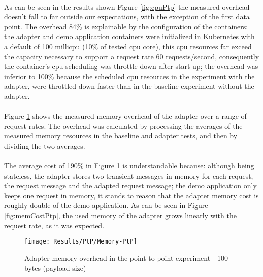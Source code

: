 \paragraph{}

As can be seen in the results shown Figure \ref{fig:cpuPtp} the measured overhead doesn't fall to far outside our expectations, with the exception of the first data point.
The overhead 84\% is explainable by the configuration of the containers:
the adapter and demo application containers were initialized in Kubernetes with a default of 100 millicpu (10\% of tested cpu core),
this cpu resources far exceed the capacity necessary to support a request rate 60 requests/second,
consequently the container's cpu scheduling was throttle-down after start up;
the overhead was inferior to 100\% because the scheduled cpu resources in the experiment with the adapter, were throttled down faster than in the baseline experiment without the adapter.

\paragraph{}

Figure \ref{fig:memPtp} shows the measured memory overhead of the adapter over a
range of request rates.
The overhead was calculated by processing the averages of the measured memory resources in the baseline and adapter tests, and then by dividing the two averages.

\paragraph{}

The average cost of 190\% in Figure \ref{fig:memPtp} is understandable because: although being stateless, the adapter stores two transient messages in memory for each request, the request message and the adapted request message;
the demo application only keeps one request in memory, it stands to reason that the adapter memory cost is roughly double of the demo application.
As can be seen in Figure \ref{fig:memCostPtp}, the used memory of the adapter grows linearly with the request rate, as it was expected.

\begin{figure}[htbp]
    \centering
    \centerline{\texttt{[image: Results/PtP/Memory-PtP]}}
    \caption{Adapter memory overhead in the point-to-point experiment - 100 bytes (payload size)}
    \label{fig:memPtp}
\end{figure}

